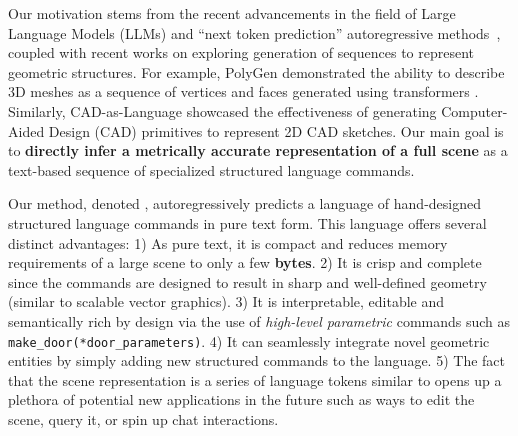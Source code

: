 Our motivation stems from the recent advancements in the field of Large Language Models (LLMs) and ``next token prediction'' autoregressive methods~\cite{openai2023gpt4}, coupled with recent works on exploring generation of sequences to represent geometric structures. For example, PolyGen \cite{nash2020polygen} demonstrated the ability to describe 3D meshes as a sequence of vertices and faces generated using transformers \cite{vaswani2017attention}. Similarly, CAD-as-Language \cite{ganin2021computer} showcased the effectiveness of generating Computer-Aided Design (CAD) primitives to represent 2D CAD sketches. 
Our main goal is to \textbf{directly infer a metrically accurate representation of a full scene} as a text-based sequence of specialized structured language commands.


Our method, denoted \METHOD, autoregressively predicts a language of hand-designed structured language commands in pure text form. This language offers several distinct advantages: 1) As pure text, it is compact and reduces memory requirements of a large scene to only a few \textbf{bytes}. 2) It is crisp and complete since the commands are designed to result in sharp and well-defined geometry (similar to scalable vector graphics). 3) It is interpretable, editable and semantically rich by design via the use of \textit{high-level parametric} commands such as \texttt{make\_door(*door\_parameters)}. 4) It can seamlessly integrate novel geometric entities by simply adding new structured commands to the language. 5) The fact that the scene representation is a series of language tokens similar to \cite{openai2023gpt4} opens up a plethora of potential new applications in the future such as ways to edit the scene, query it, or spin up chat interactions. 


